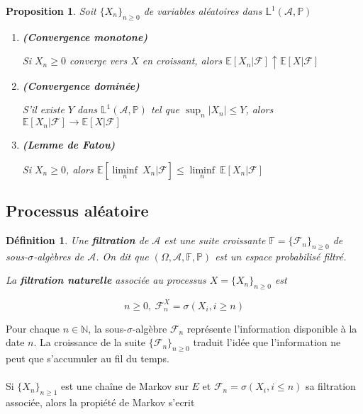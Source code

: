 \documentclass[10pt,a4paper,oneside]{article}
\newtheorem{proposition}{Proposition}
\newtheorem{definition}{Définition}
\begin{document}
\begin{proposition}
Soit $\{ X_n \}_{n \geq 0}$ de variables aléatoires dans $\mathbb{L}^1(\mathcal{A}, \mathbb{P})$

\begin{enumerate}
\item
\textbf{(Convergence monotone)}

Si $X_n \geq 0$ converge vers $X$ en croissant, alors $ \mathbb{E}[X_n | \mathcal{F}] \uparrow \mathbb{E}[X | \mathcal{F}] $

\item
\textbf{(Convergence dominée)}

S'il existe $Y$ dans $\mathbb{L}^1(\mathcal{A},\mathbb{P})$ tel que $\sup_n |X_n| \leq Y$, alors $\mathbb{E}[X_n | \mathcal{F}] \to \mathbb{E}[X | \mathcal{F}]$

\item
\textbf{(Lemme de Fatou)}

Si $X_n \geq 0$, alors $ \mathbb{E}[ \underset{n}{\liminf}\ X_n | \mathcal{F}] \leq \underset{n}{\liminf}\ \mathbb{E}[X_n | \mathcal{F}] $
\end{enumerate}
\end{proposition}

\subsection{Processus aléatoire}

\begin{definition}
Une \textbf{filtration} de $\mathcal{A}$ est une suite croissante $\mathbb{F} = \{ \mathcal{F}_n \}_{n \geq 0}$ de sous-$\sigma$-algèbres de $\mathcal{A}$. On dit que $(\Omega, \mathcal{A}, \mathbb{F}, \mathbb{P})$ est un espace probabilisé filtré.

La \textbf{filtration naturelle} associée au processus $X = \{ X_n \}_{n \geq 0}$ est

\[ n \geq 0,\ \mathcal{F}_n^X = \sigma(X_i,i \geq n) \]
\end{definition}

Pour chaque $n \in \mathbb{N}$, la sous-$\sigma$-algèbre $\mathcal{F}_n$ représente l'information disponible à la date $n$. La croissance de la suite $\{ \mathcal{F}_n \}_{n \geq 0}$ traduit l'idée que l'information ne peut que s'accumuler au fil du temps.
\\ \\
Si $\{ X_n \}_{n \geq 1}$ est une chaîne de Markov sur $E$ et $\mathcal{F}_n = \sigma(X_i,i \leq n)$ sa filtration associée, alors la propiété de Markov s'ecrit
\end{document}

